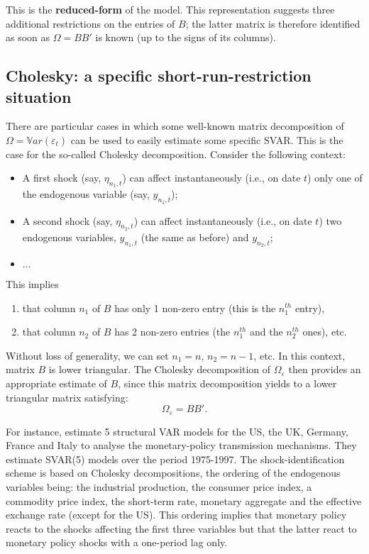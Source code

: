 \documentclass[
  12pt,
]{book}
\providecommand{\tightlist}{%
  \setlength{\itemsep}{0pt}\setlength{\parskip}{0pt}}
\theoremstyle{definition}
\theoremstyle{definition}
\theoremstyle{definition}
\theoremstyle{definition}
\theoremstyle{remark}
\begin{document}
This is the \textbf{reduced-form} of the model. This representation suggests three additional restrictions on the entries of \(B\); the latter matrix is therefore identified as soon as \(\Omega = BB'\) is known (up to the signs of its columns).

\hypertarget{cholesky-a-specific-short-run-restriction-situation}{%
\subsection{Cholesky: a specific short-run-restriction situation}\label{cholesky-a-specific-short-run-restriction-situation}}

There are particular cases in which some well-known matrix decomposition of \(\Omega=\mathbb{V}ar(\varepsilon_t)\) can be used to easily estimate some specific SVAR. This is the case for the so-called Cholesky decomposition. Consider the following context:

\begin{itemize}
\tightlist
\item
  A first shock (say, \(\eta_{n_1,t}\)) can affect instantaneously
  (i.e., on date \(t\)) only one of the endogenous variable (say, \(y_{n_1,t}\));
\item
  A second shock (say, \(\eta_{n_2,t}\)) can affect instantaneously
  (i.e., on date \(t\)) two endogenous variables, \(y_{n_1,t}\) (the same as before) and \(y_{n_2,t}\);
\item
  \(\dots\)
\end{itemize}

This implies

\begin{enumerate}
\def\labelenumi{\arabic{enumi}.}
\tightlist
\item
  that column \(n_1\) of \(B\) has only 1 non-zero entry (this is the \(n_1^{th}\) entry),
\item
  that column \(n_2\) of \(B\) has 2 non-zero entries (the \(n_1^{th}\) and the \(n_2^{th}\) ones), etc.
\end{enumerate}

Without loss of generality, we can set \(n_1=n\), \(n_2=n-1\), etc. In this context, matrix \(B\) is lower triangular. The Cholesky decomposition of \(\Omega_{\varepsilon}\) then provides an appropriate estimate of \(B\), since this matrix decomposition yields to a lower triangular matrix satisfying:
\[
\Omega_\varepsilon = BB'.
\]

For instance, \citet{DEDOLA20051543} estimate 5 structural VAR models for the US, the UK, Germany, France and Italy to analyse the monetary-policy transmission mechanisms. They estimate SVAR(5) models over the period 1975-1997. The shock-identification scheme is based on Cholesky decompositions, the ordering of the endogenous variables being: the industrial production, the consumer price index, a commodity price index, the short-term rate, monetary aggregate and the effective exchange rate (except for the US). This ordering implies that monetary policy reacts to the shocks affecting the first three variables but that the latter react to monetary policy shocks with a one-period lag only.
\end{document}
